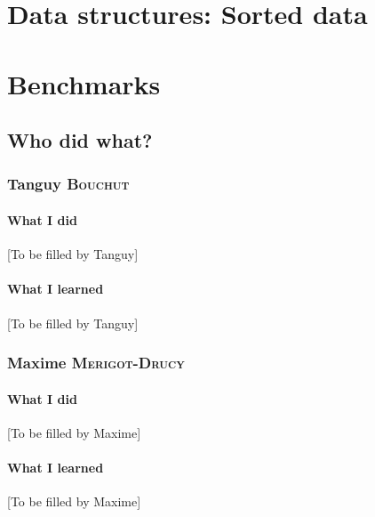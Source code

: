 \documentclass[a4paper,notitlepage]{report}
\newcommand{\authorOne}   {Tanguy \textsc{Bouchut}}
\newcommand{\authorTwo}   {Maxime \textsc{Merigot-Drucy}}
\begin{document}









\part{Data structures: Sorted data}










\part{Benchmarks}










\appendix




\chapter{Who did what?}

\section{\authorOne}

\subsection{What I did}
[To be filled by Tanguy]

\subsection{What I learned}
[To be filled by Tanguy]


\section{\authorTwo}

\subsection{What I did}
[To be filled by Maxime]

\subsection{What I learned}
[To be filled by Maxime]




\printbibliography
\end{document}
